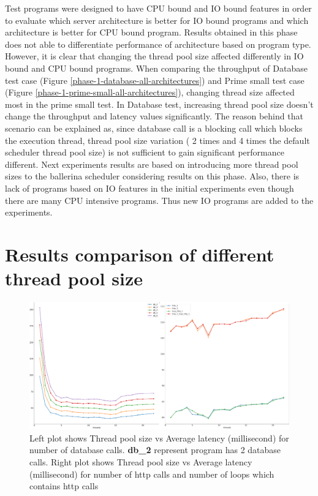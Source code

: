 Test programs were designed to have CPU bound and IO bound features in order to evaluate which server architecture is better for IO bound programs and which architecture is better for CPU bound program. Results obtained in this phase does not able to differentiate performance of architecture based on program type. However, it is clear that changing the thread pool size affected differently in IO bound and CPU bound programs. When comparing the throughput of Database test case (Figure \ref{phase-1-database-all-architectures}) and Prime small test case (Figure \ref{phase-1-prime-small-all-architectures}), changing thread size affected most in the prime small test. In Database test, increasing thread pool size doesn't change the throughput and latency values significantly. The reason behind that scenario can be explained as, since database call is a blocking call which blocks the execution thread, thread pool size variation ( 2 times and 4 times the default scheduler thread pool size) is not sufficient to gain significant performance different. Next experiments results are based on introducing more thread pool sizes to the ballerina scheduler considering results on this phase. Also, there is lack of programs based on IO features in the initial experiments even though there are many CPU intensive programs. Thus new IO programs are added to the experiments.

\section{Results comparison of different thread pool size}

\begin{figure}[htbp]
	\begin{center}
		\includegraphics[scale=1]{figures/pool-db-http.png}
	\end{center}
	\caption{Left plot shows Thread pool size vs Average latency (millisecond) for number of database calls. \textbf{db\_2} represent program has 2 database calls. Right plot shows Thread pool size vs Average latency (millisecond) for number of http calls and number of loops which contains http calls}
	\label{thread_pool_database_and_http}
\end{figure}

